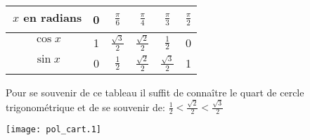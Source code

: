 \documentclass[a4paper]{article}
\begin{document}
\begin{minipage}[l]{6.8cm}

\renewcommand{\arraystretch}{1.5}
\begin{tabular}{||c|c|c|c|c|c||}
\hline 
 $\dfrac{}{}$$ x$ en radians& 
0& $\frac{\pi}{6}$&$\frac{\pi}{4}$&$\frac{\pi}{3}$&$\frac{\pi}{2}$ \\\hline \hline
 $\dfrac{}{}$$ \cos x$& 
1& $\frac{\sqrt{3}}{2}$&$\frac{\sqrt{2}}{2}$&$\frac{1}{2}$&0 \\\hline

 $\dfrac{}{}$$ \sin x$& 
0& $\frac{1}{2}$&$\frac{\sqrt{2}}{2}$&$\frac{\sqrt{3}}{2}$&1 \\\hline 
\end{tabular}
\label{tab1}
\renewcommand{\arraystretch}{1}
 Pour se souvenir de ce tableau il suffit de conna\^itre le quart de
 cercle trigonom\'etrique  et de se souvenir de: 
$\frac{1}{2}<\frac{\sqrt{2}}{2}<\frac{\sqrt{3}}{2}$
\end{minipage}
\begin{minipage}[l]{0.5\textwidth}
\begin{center}
     
\texttt{[image: pol\_cart.1]}%
\end{center}
\end{minipage}
\end{document}
